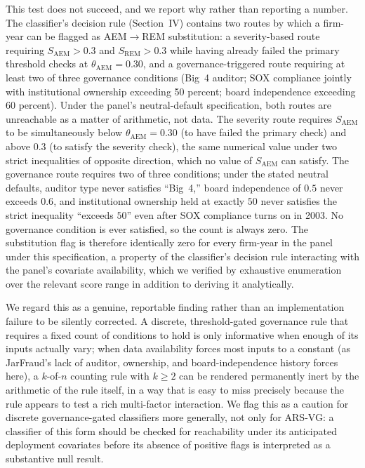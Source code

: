 \documentclass[12pt]{article}
\begin{document}
This test does not succeed, and we report why rather than reporting a
number.  The classifier's decision rule (Section~IV) contains two
routes by which a firm-year can be flagged as AEM$\to$REM substitution:
a severity-based route requiring $S_{\text{AEM}} > 0.3$ and
$S_{\text{REM}} > 0.3$ while having already failed the primary
threshold checks at $\theta_{\text{AEM}} = 0.30$, and a
governance-triggered route requiring at least two of three governance
conditions (Big~4 auditor; SOX compliance jointly with institutional
ownership exceeding 50 percent; board independence exceeding 60
percent).  Under the panel's neutral-default specification, both routes
are unreachable as a matter of arithmetic, not data.  The severity route
requires $S_{\text{AEM}}$ to be simultaneously below $\theta_{\text{AEM}}
= 0.30$ (to have failed the primary check) and above $0.3$ (to satisfy
the severity check), the same numerical value under two strict
inequalities of opposite direction, which no value of $S_{\text{AEM}}$
can satisfy.  The governance route requires two of three conditions;
under the stated neutral defaults, auditor type never satisfies
``Big~4,'' board independence of $0.5$ never exceeds $0.6$, and
institutional ownership held at exactly $50$ never satisfies the strict
inequality ``exceeds $50$'' even after SOX compliance turns on in 2003.
No governance condition is ever satisfied, so the count is always zero.
The substitution flag is therefore identically zero for every firm-year
in the panel under this specification, a property of the classifier's
decision rule interacting with the panel's covariate availability, which
we verified by exhaustive enumeration over the relevant score range in
addition to deriving it analytically.

We regard this as a genuine, reportable finding rather than an
implementation failure to be silently corrected.  A discrete,
threshold-gated governance rule that requires a fixed count of
conditions to hold is only informative when enough of its inputs
actually vary; when data availability forces most inputs to a constant
(as JarFraud's lack of auditor, ownership, and board-independence
history forces here), a $k$-of-$n$ counting rule with $k \geq 2$ can
be rendered permanently inert by the arithmetic of the rule itself, in
a way that is easy to miss precisely because the rule appears to test
a rich multi-factor interaction.  We flag this as a caution for
discrete governance-gated classifiers more generally, not only for
ARS-VG: a classifier of this form should be checked for reachability
under its anticipated deployment covariates before its absence of
positive flags is interpreted as a substantive null result.
\end{document}
